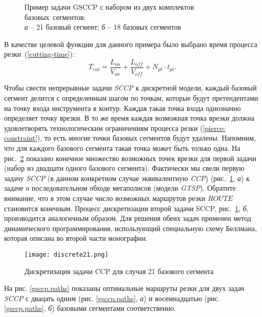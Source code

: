 \begin{figure}[H]
  \centering
  \caption{
    Пример задачи GSCCP с набором из двух комплектов базовых~сегментов: \\
    {\it а} -- 21 базовый сегмент;
    {\it б} -- 18 базовых сегментов
    }
  \label{gsccp-both}
\end{figure}

В качестве целевой функции для данного примера было выбрано
время процесса резки~(\ref{cutting-time}):
$$
  T_{cut} = \frac{L_{on}}{V_{on}} + \frac{L_{off}}{V_{off}} +N_{pt} \cdot t_{pt}
  .
$$

Чтобы свести непрерывные задачи {\it SCCP}
к дискретной модели,
каждый базовый сегмент делится с определенным шагом по точкам,
которые будут претендентами на точку входа инструмента в контур.
Каждая такая точка входа однозначно определяет точку врезки.
В то же время каждая возможная точка врезки должна
удовлетворять технологическим ограничениям процесса резки
(\ref{pierce-constraint}),
то есть многие точки базовых сегментов будут удалены.
Напомним, что для каждого базового сегмента
такая точка может быть только одна.
На рис.~\ref{discrete21}
показано конечное множество возможных точек врезки
для первой задачи
(набор из двадцати одного базового сегмента).
Фактически мы свели первую задачу {\it SCCP}
(в данном конкретном случае эквивалентную {\it CCP})
(рис.~\ref{gsccp-both}, {\it а})
к задаче о последовательном обходе мегаполисов (модели {\it GTSP}).
Обратите внимание,
что в этом случае число возможных маршрутов резки $ROUTE$
становится конечным.
Процесс дискретизации второй задачи SCCP,
рис.~\ref{gsccp-both}, {\it б},
производится аналогичным образом.
Для решения обеих задач применен метод динамического программирования,
использующий специальную схему Беллмана,
которая описана во второй части монографии.

\begin{figure}[H]
  \centering
  \texttt{[image: discrete21.png]}
  \caption{
    Дискретизация задачи CCP
    для случая 21 базового сегмента
  }
  \label{discrete21}
\end{figure}

На рис. \ref{gsccp.paths}
показаны оптимальные маршруты резки для двух задач {\it SCCP}
с двацать одним
(рис. \ref{gsccp.paths}, {\it а})
и восемнадцатью
(рис. \ref{gsccp.paths}, {\it б})
базовыми сегментами соответственно.

